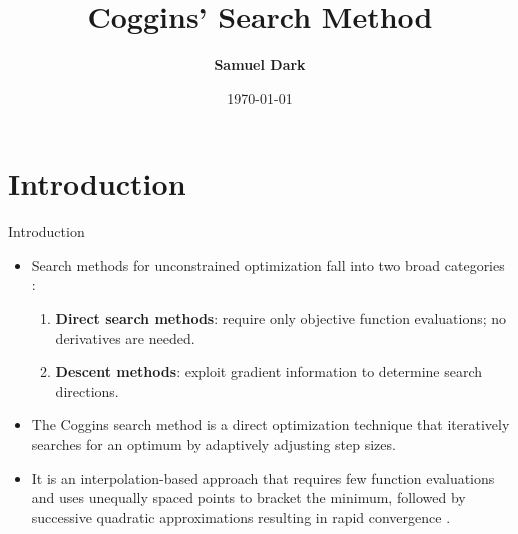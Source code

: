 \documentclass{beamer}
\title{Coggins' Search Method}
\subtitle{}
\author{\bf{Samuel Dark}}
\date{\today}
\begin{document}
\maketitle


\section{Introduction}
\begin{frame}[allowframebreaks]{Introduction}
\begin{itemize}

\item Search methods for unconstrained optimization fall into two broad
categories \cite{odekunle2009}:
\begin{enumerate}
    \item \textbf{Direct search methods}: require only objective
    function evaluations; no derivatives are needed.
    \item \textbf{Descent methods}: exploit gradient information to
    determine search directions.
\end{enumerate}

\item The Coggins search method is a direct optimization technique
that iteratively searches for an optimum by adaptively
adjusting step sizes.
\item It is an interpolation-based approach that requires few function
evaluations and uses unequally spaced points to bracket the minimum,
followed by successive quadratic approximations resulting in rapid
convergence \cite{bamigbola2004}. 
 \end{itemize}
\end{frame}




\end{document}
